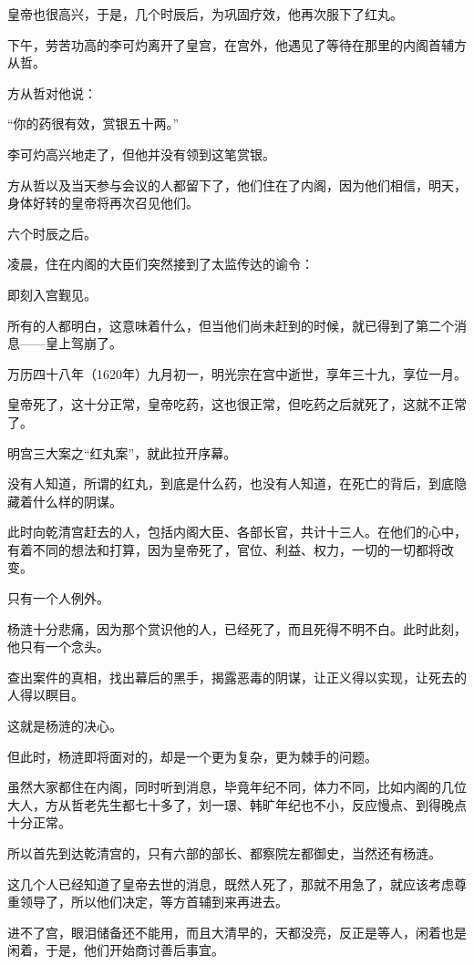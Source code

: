 \begin{multicols}{\theparacolNo}
皇帝也很高兴，于是，几个时辰后，为巩固疗效，他再次服下了红丸。

下午，劳苦功高的李可灼离开了皇宫，在宫外，他遇见了等待在那里的内阁首辅方从哲。

方从哲对他说：

“你的药很有效，赏银五十两。”

李可灼高兴地走了，但他并没有领到这笔赏银。

方从哲以及当天参与会议的人都留下了，他们住在了内阁，因为他们相信，明天，身体好转的皇帝将再次召见他们。

六个时辰之后。

凌晨，住在内阁的大臣们突然接到了太监传达的谕令：

即刻入宫觐见。

所有的人都明白，这意味着什么，但当他们尚未赶到的时候，就已得到了第二个消息——皇上驾崩了。

万历四十八年（1620年）九月初一，明光宗在宫中逝世，享年三十九，享位一月。

皇帝死了，这十分正常，皇帝吃药，这也很正常，但吃药之后就死了，这就不正常了。

明宫三大案之“红丸案”，就此拉开序幕。

没有人知道，所谓的红丸，到底是什么药，也没有人知道，在死亡的背后，到底隐藏着什么样的阴谋。

此时向乾清宫赶去的人，包括内阁大臣、各部长官，共计十三人。在他们的心中，有着不同的想法和打算，因为皇帝死了，官位、利益、权力，一切的一切都将改变。

只有一个人例外。

杨涟十分悲痛，因为那个赏识他的人，已经死了，而且死得不明不白。此时此刻，他只有一个念头。

查出案件的真相，找出幕后的黑手，揭露恶毒的阴谋，让正义得以实现，让死去的人得以瞑目。

这就是杨涟的决心。

但此时，杨涟即将面对的，却是一个更为复杂，更为棘手的问题。

虽然大家都住在内阁，同时听到消息，毕竟年纪不同，体力不同，比如内阁的几位大人，方从哲老先生都七十多了，刘一璟、韩旷年纪也不小，反应慢点、到得晚点十分正常。

所以首先到达乾清宫的，只有六部的部长、都察院左都御史，当然还有杨涟。

这几个人已经知道了皇帝去世的消息，既然人死了，那就不用急了，就应该考虑尊重领导了，所以他们决定，等方首辅到来再进去。

进不了宫，眼泪储备还不能用，而且大清早的，天都没亮，反正是等人，闲着也是闲着，于是，他们开始商讨善后事宜。


\end{multicols}
